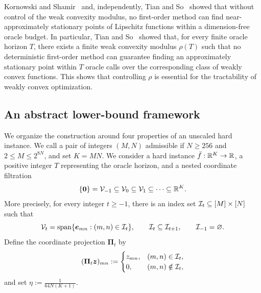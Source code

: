 \begin{remark}
Kornowski and Shamir~\citep{kornowski2022oracle} and, independently,
Tian and So~\citep{tian2021hardness} showed that without control of
the weak convexity modulus, no first-order method can find
near-approximately stationary points of Lipschitz functions within a
dimension-free oracle budget. In particular, Tian and So~\citep{tian2021hardness} showed that,
for every finite oracle horizon $T$, there exists a finite weak
convexity modulus $\rho(T)$ such that no deterministic first-order
method can guarantee finding an approximately stationary point within
$T$ oracle calls over the corresponding class of weakly convex
functions. This shows that controlling $\rho$ is essential for the
tractability of weakly convex optimization.
\end{remark}

\subsection{An abstract lower-bound framework}
We organize the construction around four properties
of an unscaled hard instance. 
We call a pair of
integers $(M, N)$ admissible  
if $N\ge256$ and $2\le M\le2^{8N}$, and set $K=MN$.  
We consider a hard instance $\bar f:{\mathbb{R}}^K\to{\mathbb{R}}$, a positive
integer $T$ representing the oracle horizon, and
a nested coordinate filtration
\[
 \{{\mathbf 0}\}={\cal V}_{-1}\subseteq{\cal V}_0
 \subseteq{\cal V}_1\subseteq\cdots\subseteq{\mathbb{R}}^K.
\]
More precisely, for every integer $t\ge-1$,
there is an index set ${\cal I}_t\subseteq[M]\times[N]$
such that
\[
 {\cal V}_t
 =\operatorname{span}
 \{\bm e_{mn}:(m,n)\in{\cal I}_t\},
 \qquad
 {\cal I}_t\subseteq{\cal I}_{t+1},
 \qquad
 {\cal I}_{-1}=\varnothing.
\]
Define the coordinate projection $\mathbf{\Pi}_t$ by
\[
 (\mathbf{\Pi}_t\bm{z})_{mn}
 :=
 \begin{cases}
 z_{mn}, & (m,n)\in{\cal I}_t,\\
 0, & (m,n)\notin{\cal I}_t,
 \end{cases}
\]
and set $\eta:=\tfrac1{64N(K+1)}$.

